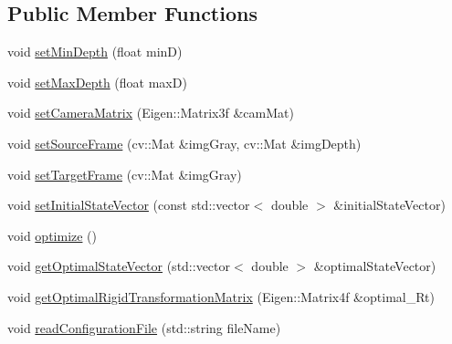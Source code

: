 \subsection*{Public Member Functions}
\begin{DoxyCompactItemize}
\item 
void \hyperlink{class_photoconsistency_odometry_1_1_analytic_1_1_c_photoconsistency_odometry_analytic_af473a25172cf498f50cec44b697f8e81}{setMinDepth} (float minD)
\item 
void \hyperlink{class_photoconsistency_odometry_1_1_analytic_1_1_c_photoconsistency_odometry_analytic_a5553935095782a68830efa1d4f4ccce5}{setMaxDepth} (float maxD)
\item 
void \hyperlink{class_photoconsistency_odometry_1_1_analytic_1_1_c_photoconsistency_odometry_analytic_af55a42286ff6f056ad33103dd7c3b0a9}{setCameraMatrix} (Eigen::Matrix3f \&camMat)
\item 
void \hyperlink{class_photoconsistency_odometry_1_1_analytic_1_1_c_photoconsistency_odometry_analytic_a540df6929640bf7c1c248e27cc952772}{setSourceFrame} (cv::Mat \&imgGray, cv::Mat \&imgDepth)
\item 
void \hyperlink{class_photoconsistency_odometry_1_1_analytic_1_1_c_photoconsistency_odometry_analytic_ac2f9288148db6b93b5cbe6a77818106d}{setTargetFrame} (cv::Mat \&imgGray)
\item 
void \hyperlink{class_photoconsistency_odometry_1_1_analytic_1_1_c_photoconsistency_odometry_analytic_a6765ca12e063b199624e408fe07d2c13}{setInitialStateVector} (const std::vector$<$ double $>$ \&initialStateVector)
\item 
void \hyperlink{class_photoconsistency_odometry_1_1_analytic_1_1_c_photoconsistency_odometry_analytic_aadf26b26688281cd18375984c1cc719e}{optimize} ()
\item 
void \hyperlink{class_photoconsistency_odometry_1_1_analytic_1_1_c_photoconsistency_odometry_analytic_ad48c2851da3b626484d2d005b81d9b4e}{getOptimalStateVector} (std::vector$<$ double $>$ \&optimalStateVector)
\item 
void \hyperlink{class_photoconsistency_odometry_1_1_analytic_1_1_c_photoconsistency_odometry_analytic_a48873715c3dc7a6ad8e8359d7c03254d}{getOptimalRigidTransformationMatrix} (Eigen::Matrix4f \&optimal\_\-Rt)
\item 
void \hyperlink{class_photoconsistency_odometry_1_1_analytic_1_1_c_photoconsistency_odometry_analytic_a96b148bbad6c72053fc93366bb0085d2}{readConfigurationFile} (std::string fileName)
\end{DoxyCompactItemize}
